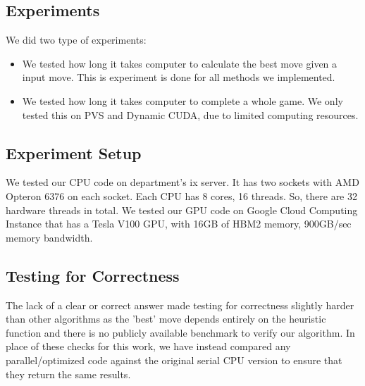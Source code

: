 \subsection{Experiments}
We did two type of experiments:
\begin{itemize}
    \item We tested how long it takes computer to calculate the best move given a input move. This is experiment is done for all methods we implemented.
    \item We tested how long it takes computer to complete a whole game. We only tested this on PVS and Dynamic CUDA, due to limited computing resources.
\end{itemize}

\subsection{Experiment Setup}
We tested our CPU code on department's ix server. It has two sockets with AMD Opteron 6376 on each socket. Each CPU has 8 cores, 16 threads. So, there are 32 hardware threads in total. We tested our GPU code on Google Cloud Computing Instance that has a Tesla V100 GPU, with 16GB of HBM2 memory, 900GB/sec memory bandwidth.

\subsection{Testing for Correctness}
The lack of a clear or correct answer made testing for correctness slightly harder than other algorithms as the 'best' move depends entirely on the heuristic function and there is no publicly available benchmark to verify our algorithm. In place of these checks for this work, we have instead compared any parallel/optimized code against the original serial CPU version to ensure that they return the same results. 